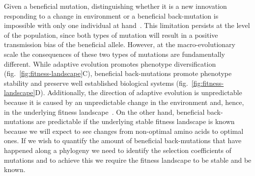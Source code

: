 \documentclass{article}
\begin{document}
    Given a beneficial mutation, distinguishing whether it is a new innovation responding to a change in environment or a beneficial back-mutation is impossible with only one individual at hand~\cite{charlesworth_other_2007}.
    This limitation persists at the level of the population, since both types of mutation will result in a positive transmission bias of the beneficial allele.
    However, at the macro-evolutionary scale the consequences of these two types of mutations are fundamentally different.
    While adaptive evolution promotes phenotype diversification (fig.~\ref{fig:fitness-landscape}C), beneficial back-mutations promote phenotype stability and preserve well established biological systems (fig.~\ref{fig:fitness-landscape}D).
    Additionally, the direction of adaptive evolution is unpredictable because it is caused by an unpredictable change in the environment and, hence, in the underlying fitness landscape~\cite{bazykin_changing_2015}.
    On the other hand, beneficial back-mutations are predictable if the underlying stable fitness landscape is known because we will expect to see changes from non-optimal amino acids to optimal ones.
    If we wish to quantify the amount of beneficial back-mutations that have happened along a phylogeny we need to identify the selection coefficients of mutations and to achieve this we require the fitness landscape to be stable and be known.
\end{document}

